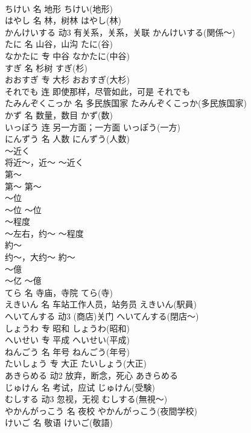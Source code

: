 \documentclass[8pt]{extreport}
\begin{document}
\begin{CJK}{UTF8}{min}
\\	ちけい	名	地形	ちけい(地形)	
\\	はやし	名	林，树林	はやし(林)	
\\	かんけいする	动3	有关系，关系，关联	かんけいする(関係～)	
\\	たに	名	山谷，山沟	たに(谷)	
\\	なかたに	专	中谷	なかたに(中谷)	
\\	すぎ	名	杉树	すぎ(杉)	
\\	おおすぎ	专	大杉	おおすぎ(大杉)	
\\	それでも	连	即使那样，尽管如此，可是	それでも	
\\	たみんぞくこっか	名	多民族国家	たみんぞくこっか(多民族国家)	
\\	かず	名	数量，数目	かず(数)	
\\	いっぽう	连	另一方面；一方面	いっぽう(一方)	
\\	にんずう	名	人数	にんずう(人数)	
\\	～近く	
\\	将近～，近～	～近く	
\\	第～	
\\	第～	第～	
\\	～位	
\\	～位	～位	
\\	～程度	
\\	～左右，约～	～程度	
\\	約～	
\\	约～，大约～	約～	
\\	～億	
\\	～亿	～億	
\\	てら	名	寺庙，寺院	てら(寺)	
\\	えきいん	名	车站工作人员，站务员	えきいん(駅員)	
\\	へいてんする	动3	(商店)关门	へいてんする(閉店～)	
\\	しょうわ	专	昭和	しょうわ(昭和)	
\\	へいせい	专	平成	へいせい(平成)	
\\	ねんごう	名	年号	ねんごう(年号)	
\\	たいしょう	专	大正	たいしょう(大正)	
\\	あきらめる	动2	放弃，断念，死心	あきらめる	
\\	じゅけん	名	考试，应试	じゅけん(受験)	
\\	むしする	动3	忽视，无视	むしする(無視～)	
\\	やかんがっこう	名	夜校	やかんがっこう(夜間学校)	
\\	けいご	名	敬语	けいご(敬語)	

\end{CJK}
\end{document}
